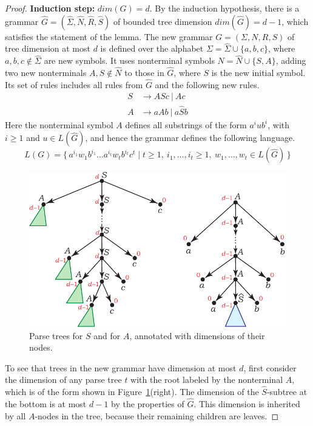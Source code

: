 \documentclass[runningheads]{llncs}
\newcommand{\set}[2]{\{ \, #1 \mid #2 \, \}}
\begin{document}
\begin{proof}
\textbf{Induction step:} $dim(G) = d$.
By the induction hypothesis,
there is a grammar $\widehat{G} = (\widehat{\Sigma}, \widehat{N}, \widehat{R}, \widehat{S})$
of bounded tree dimension $dim(\widehat{G}) = d-1$,
which satisfies the statement of the lemma.
The new grammar $G = (\Sigma, N, R, S)$ of tree dimension at most $d$
is defined over the alphabet 
$\Sigma = \widehat{\Sigma} \cup \{a, b, c\}$,
where $a, b, c \not\in \widehat{\Sigma}$ are new symbols.
It uses nonterminal symbols
$N = \widehat{N} \cup \{S, A\}$,
adding two new nonterminals $A, S \not\in \widehat{N}$ to those in $\widehat{G}$,
where $S$ is the new initial symbol.
Its set of rules includes all rules from $\widehat{G}$
and the following new rules.
\begin{align*}
	S &\to A S c \ | \ A c \\
	A &\to a A b \ | \ a \widehat{S} b
\end{align*}
Here the nonterminal symbol $A$ defines all substrings of the form $a^i u b^i$,
with $i \geqslant 1$ and $u \in L(\widehat{G})$,
and hence the grammar defines the following language.
\begin{equation*}
	L(G)=\set{a^{i_1} w_1 b^{i_1} \ldots a^{i_t} w_t b^{i_t} c^t}{t \geqslant 1, \:
		i_1, \ldots, i_t \geqslant 1, \:
		w_1, \ldots, w_t \in L(\widehat{G})}
\end{equation*}

\begin{figure}[t]
\centering
\includegraphics[scale=0.9]{rational_index_parse_tree_S_A.pdf}
\caption{Parse trees for $S$ and for $A$, annotated with dimensions of their nodes.}
\label{dimsubtree}
\end{figure}

To see that trees in the new grammar have dimension at most $d$,
first consider the dimension of any parse tree $t$ with the root labeled by the nonterminal $A$,
which is of the form shown in Figure~\ref{dimsubtree}(right).
The dimension of the $\widehat{S}$-subtree at the bottom
is at most $d-1$ by the properties of $\widehat{G}$.
This dimension is inherited by all $A$-nodes in the tree,
because their remaining children are leaves.


\end{proof}
\end{document}
